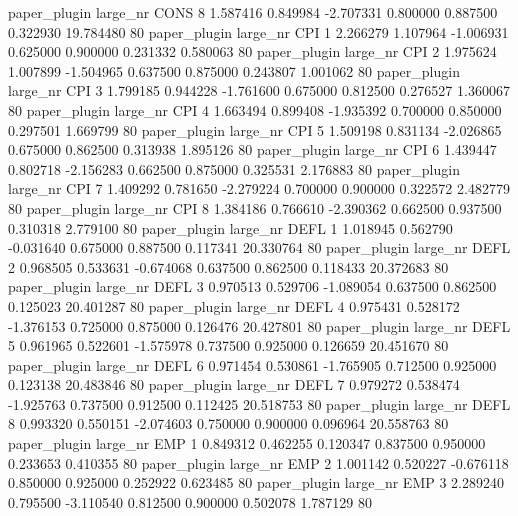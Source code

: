        paper_plugin   large_nr     CONS                 8  1.587416  0.849984  -2.707331 0.800000 0.887500  0.322930   19.784480 80
       paper_plugin   large_nr      CPI                 1  2.266279  1.107964  -1.006931 0.625000 0.900000  0.231332    0.580063 80
       paper_plugin   large_nr      CPI                 2  1.975624  1.007899  -1.504965 0.637500 0.875000  0.243807    1.001062 80
       paper_plugin   large_nr      CPI                 3  1.799185  0.944228  -1.761600 0.675000 0.812500  0.276527    1.360067 80
       paper_plugin   large_nr      CPI                 4  1.663494  0.899408  -1.935392 0.700000 0.850000  0.297501    1.669799 80
       paper_plugin   large_nr      CPI                 5  1.509198  0.831134  -2.026865 0.675000 0.862500  0.313938    1.895126 80
       paper_plugin   large_nr      CPI                 6  1.439447  0.802718  -2.156283 0.662500 0.875000  0.325531    2.176883 80
       paper_plugin   large_nr      CPI                 7  1.409292  0.781650  -2.279224 0.700000 0.900000  0.322572    2.482779 80
       paper_plugin   large_nr      CPI                 8  1.384186  0.766610  -2.390362 0.662500 0.937500  0.310318    2.779100 80
       paper_plugin   large_nr     DEFL                 1  1.018945  0.562790  -0.031640 0.675000 0.887500  0.117341   20.330764 80
       paper_plugin   large_nr     DEFL                 2  0.968505  0.533631  -0.674068 0.637500 0.862500  0.118433   20.372683 80
       paper_plugin   large_nr     DEFL                 3  0.970513  0.529706  -1.089054 0.637500 0.862500  0.125023   20.401287 80
       paper_plugin   large_nr     DEFL                 4  0.975431  0.528172  -1.376153 0.725000 0.875000  0.126476   20.427801 80
       paper_plugin   large_nr     DEFL                 5  0.961965  0.522601  -1.575978 0.737500 0.925000  0.126659   20.451670 80
       paper_plugin   large_nr     DEFL                 6  0.971454  0.530861  -1.765905 0.712500 0.925000  0.123138   20.483846 80
       paper_plugin   large_nr     DEFL                 7  0.979272  0.538474  -1.925763 0.737500 0.912500  0.112425   20.518753 80
       paper_plugin   large_nr     DEFL                 8  0.993320  0.550151  -2.074603 0.750000 0.900000  0.096964   20.558763 80
       paper_plugin   large_nr      EMP                 1  0.849312  0.462255   0.120347 0.837500 0.950000  0.233653    0.410355 80
       paper_plugin   large_nr      EMP                 2  1.001142  0.520227  -0.676118 0.850000 0.925000  0.252922    0.623485 80
       paper_plugin   large_nr      EMP                 3  2.289240  0.795500  -3.110540 0.812500 0.900000  0.502078    1.787129 80
